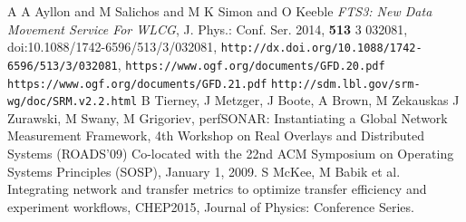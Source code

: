 \begin{thebibliography}{1}
 {A A Ayllon and M Salichos and M K Simon and O Keeble} {\it {FTS}3: New Data Movement Service For {WLCG}}, {J. Phys.: Conf. Ser.} 2014, {\bf 513} 3 032081,  doi:{10.1088/1742-6596/513/3/032081}, {\tt{http://dx.doi.org/10.1088/1742-6596/513/3/032081}},
 {\tt https://www.ogf.org/documents/GFD.20.pdf} 
 {\tt https://www.ogf.org/documents/GFD.21.pdf} 
 {\tt http://sdm.lbl.gov/srm-wg/doc/SRM.v2.2.html}
 B Tierney, J Metzger, J Boote, A Brown, M Zekauskas
J Zurawski, M Swany, M Grigoriev, perfSONAR: Instantiating a
Global Network Measurement Framework, 4th Workshop on Real Overlays and
Distributed Systems (ROADS’09) Co-located with the 22nd ACM Symposium
on Operating Systems Principles (SOSP), January 1, 2009.
 S McKee, M Babik et al. Integrating network and
transfer metrics to optimize transfer efficiency and experiment workflows,
CHEP2015, Journal of Physics: Conference Series.


\end{thebibliography}
